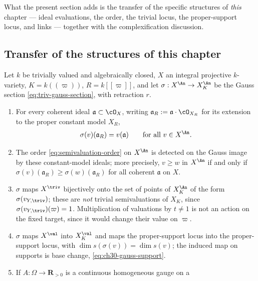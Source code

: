 What the present section adds is the transfer of the specific structures of
\emph{this} chapter --- ideal evaluations, the order, the trivial locus, the
proper-support locus, and links --- together with the complexification
discussion.

\subsection{Transfer of the structures of this chapter}
\label{sec:ch32-gauss-transfer}

\begin{theorem}
\label{thm:ch32-gauss-transfer}
Let $k$ be trivially valued and algebraically closed, $X$ an integral
projective $k$-variety, $K=k(\!(\varpi)\!)$, $R=k[\![\varpi]\!]$, and
let $\sigma:X^{\An}\to X_K^{\An}$ be the Gauss section
\eqref{eq:triv-gauss-section}, with retraction $r$.
\begin{enumerate}
\item\label{itm:ch32-gt:ideals}
For every coherent ideal $\mathfrak a\subset\cO_X$, writing
$\mathfrak a_R:=\mathfrak a\cdot\cO_{X_R}$ for its extension to
the proper constant model $X_R$,
\begin{equation}
\label{eq:ch32-gauss-ideal}
 \sigma(v)(\mathfrak a_R)=v(\mathfrak a)
 \qquad\text{for all }v\in X^{\An}.
\end{equation}
\item\label{itm:ch32-gt:order}
The order \eqref{eq:semivaluation-order} on $X^{\An}$ is detected on
the Gauss image by these constant-model ideals; more precisely, $v\geq w$ in $X^{\An}$ if and
only if $\sigma(v)(\mathfrak a_R)\geq\sigma(w)(\mathfrak a_R)$ for all
coherent $\mathfrak a$ on $X$.
\item\label{itm:ch32-gt:trivial}
$\sigma$ maps $X^{\triv}$ bijectively onto the set of points of
$X_K^{\An}$ of the form $\sigma(v_{Y,\triv})$; these are \emph{not}
trivial semivaluations of $X_K$, since
$\sigma(v_{Y,\triv})(\varpi)=1$.  Multiplication of valuations by $t\neq1$ is not an action on the
fixed target, since it would change their value on $\varpi$.
\item\label{itm:ch32-gt:support}
$\sigma$ maps $X^{\val}$ into $X_K^{\val}$ and maps the
proper-support locus into the proper-support locus, with
$\dim s(\sigma(v))=\dim s(v)$; the induced map on supports is base
change, \eqref{eq:ch30-gauss-support}.
\item\label{itm:ch32-gt:link}
If $A:\Omega\to\mathbf R_{>0}$ is a continuous homogeneous gauge on a

\end{enumerate}
\end{theorem}
